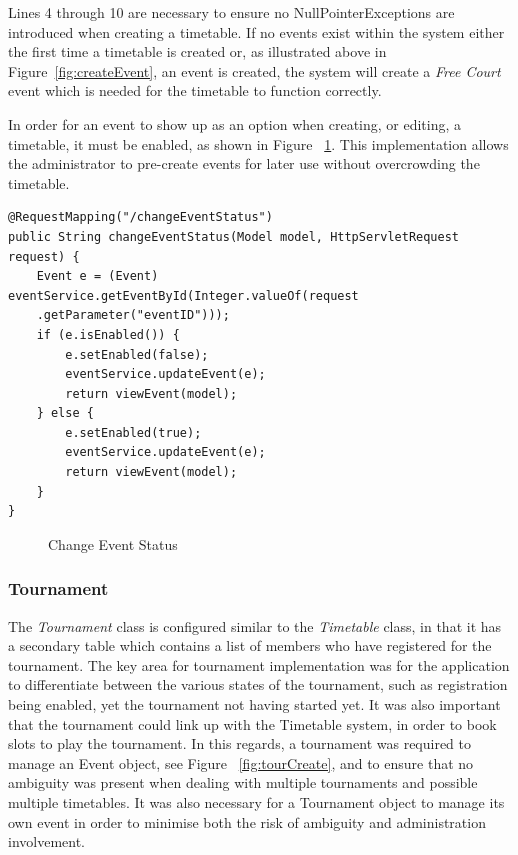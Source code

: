Lines 4 through 10 are necessary to ensure no NullPointerExceptions are introduced when creating a timetable. If no events exist within the system either the first time a timetable is created or, as illustrated above in Figure~\ref{fig:createEvent}, an event is created, the system will create a \textit{Free Court} event which is needed for the timetable to function correctly.

In order for an event to show up as an option when creating, or editing, a timetable, it must be enabled, as shown in Figure ~\ref{fig:enableEvent}. This implementation allows the administrator to pre-create events for later use without overcrowding the timetable.

\begin{lstlisting}
@RequestMapping("/changeEventStatus")
public String changeEventStatus(Model model, HttpServletRequest request) {
	Event e = (Event) eventService.getEventById(Integer.valueOf(request
	.getParameter("eventID")));
	if (e.isEnabled()) {
		e.setEnabled(false);
		eventService.updateEvent(e);
		return viewEvent(model);
	} else {
		e.setEnabled(true);
		eventService.updateEvent(e);
		return viewEvent(model);
	}
}
\end{lstlisting}
\begin{figure}[H]
\caption{Change Event Status}
\label{fig:enableEvent}
\end{figure} 	

\subsubsection{Tournament}

The \textit{Tournament} class is configured similar to the \textit{Timetable} class, in that it has a secondary table which contains a list of members who have registered for the tournament. The key area for tournament implementation was for the application to differentiate between the various states of the tournament, such as registration being enabled, yet the tournament not having started yet. It was also important that the tournament could link up with the Timetable system, in order to book slots to play the tournament. In this regards, a tournament was required to manage an Event object, see Figure ~\ref{fig:tourCreate}, and to ensure that no ambiguity was present when dealing with multiple tournaments and possible multiple timetables. It was also necessary for a Tournament object to manage its own event in order to minimise both the risk of ambiguity and administration involvement.

